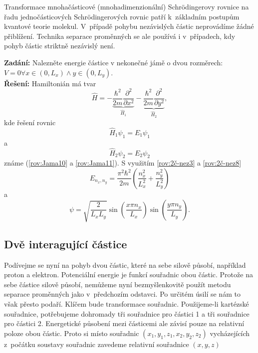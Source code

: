 Transformace mnohačásticové (mnohadimenzionální) Schr\"odingerovy rovnice na řadu jednočásticových Schr\"odingerových rovnic patří k~základním postupům kvantové teorie molekul. V~případě pohybu nezávislých částic neprovádíme žádné přiblížení. Technika separace proměnných se ale používá i v~případech, kdy pohyb částic striktně nezávislý není.     

\begin{priklad}
\textbf{Zadání:} Nalezněte energie částice v nekonečné jámě o dvou rozměrech:\\
$V = 0 \forall x \in (0, L_x) \wedge y \in (0,L_y)$. \\[0.1cm]
\textbf{Řešení:} Hamiltonián má tvar
\begin{displaymath}
\hat{H} = - \underbrace{\frac{\hbar^2}{2 m} \frac{\partial^2}{\partial x^2}}_{\hat{H}_1} - \underbrace{\frac{\hbar^2}{2m} \frac{\partial^2}{\partial y^2}}_{\hat{H}_2},
\end{displaymath}
kde řešení rovnic
\begin{displaymath}
\hat{H}_1 \psi_1 = E_1 \psi_1
\end{displaymath}
a
\begin{displaymath}
\hat{H}_2 \psi_2 = E_2 \psi_2
\end{displaymath}
známe (\eqref{rov:Jama10} a \eqref{rov:Jama11}). S využitím \eqref{rov:2č-nez3} a \eqref{rov:2č-nez8}
\begin{displaymath}
E_{n_x, n_y} = \frac{\pi^2 \hbar^2}{2m} \left( \frac{n_x^2}{L_x^2} + \frac{n_y^2}{L_y^2} \right)
\end{displaymath}
a
\begin{displaymath}
\psi = \sqrt{\frac{2}{L_x L_y}} \sin \left( \frac{x \pi n_x}{L_x} \right) \sin \left( \frac{y \pi n_y}{L_y} \right).
\end{displaymath} \vspace{-0.5cm}
\end{priklad}

\subsection{Dvě interagující částice}


Podívejme se nyní na pohyb dvou částic, které na sebe silově působí, například proton a elektron. Potenciální energie je funkcí souřadnic obou částic. Protože na sebe částice silově působí, nemůžeme nyní bezmyšlenkovitě použít metodu separace proměnných jako v~předchozím odstavci. Po určitém úsilí se nám to však přesto podaří. Klíčem bude transformace souřadnic. Použijeme-li kartézské souřadnice, potřebujeme dohromady tři souřadnice pro částici 1 a tři souřadnice pro částici 2. Energetické působení mezi částicemi ale závisí pouze na relativní poloze obou částic. Proto si místo souřadnic $(x_{1},y_{1},z_{1},x_{2},y_{2},z_{2})$ vycházejících z~počátku soustavy souřadnic zavedeme relativní souřadnice $(x,y,z)$

